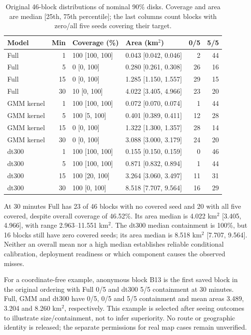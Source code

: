 \begin{table}[htbp]
\centering\small
\caption{Original 46-block distributions of nominal 90\% disks.
Coverage and area are median [25th, 75th percentile]; the last columns
count blocks with zero/all five seeds covering their target.}
\label{tab:block-calibration}\hypertarget{tab:block-calibration}{}
\begin{tabular}{@{}lrl lrr@{}}
\toprule
Model & Min & Coverage (\%) & Area (km$^2$) & 0/5 & 5/5\\
\midrule
Full & 1 & 100 [100, 100] & 0.043 [0.042, 0.046] & 2 & 44\\
Full & 5 & 0 [0, 100] & 0.280 [0.261, 0.308] & 26 & 16\\
Full & 15 & 0 [0, 100] & 1.285 [1.150, 1.557] & 29 & 15\\
Full & 30 & 10 [0, 100] & 4.022 [3.405, 4.966] & 23 & 20\\
\midrule
GMM kernel & 1 & 100 [100, 100] & 0.072 [0.070, 0.074] & 1 & 44\\
GMM kernel & 5 & 100 [5, 100] & 0.401 [0.389, 0.411] & 12 & 28\\
GMM kernel & 15 & 0 [0, 100] & 1.322 [1.300, 1.357] & 28 & 14\\
GMM kernel & 30 & 0 [0, 100] & 3.088 [3.000, 3.179] & 24 & 20\\
\midrule
dt300 & 1 & 100 [100, 100] & 0.155 [0.150, 0.159] & 0 & 46\\
dt300 & 5 & 100 [100, 100] & 0.871 [0.832, 0.894] & 1 & 44\\
dt300 & 15 & 100 [20, 100] & 3.264 [3.060, 3.497] & 11 & 31\\
dt300 & 30 & 100 [0, 100] & 8.518 [7.707, 9.564] & 16 & 29\\
\bottomrule
\end{tabular}
\end{table}

At 30 minutes Full has 23 of 46 blocks with no covered seed and 20 with
all five covered, despite overall coverage of 46.52\%. Its area median is
4.022 km$^2$ [3.405, 4.966], with range 2.963--11.551 km$^2$.
The dt300 median containment is 100\%, but 16 blocks still have zero
covered seeds; its area median is 8.518 km$^2$ [7.707, 9.564].
Neither an overall mean nor a high median establishes reliable
conditional calibration, deployment readiness or which component causes
the observed misses.

For a coordinate-free example, anonymous block B13 is the first saved
block in the original ordering with Full 0/5 and dt300 5/5 containment
at 30 minutes. Full, GMM and dt300 have 0/5, 0/5 and 5/5 containment
and mean areas 3.489, 3.204 and 8.260 km$^2$, respectively. This example
is selected after seeing outcomes to illustrate size/containment, not
to infer superiority. No route or geographic identity is released;
the separate permissions for real map cases remain unverified.

